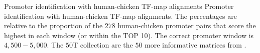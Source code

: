 \begin{table}[t!]
\begin{center}
\begin{minipage}{0.98\linewidth}\setlength{\parindent}{0pt}
\begin{center}
\end{center}
\end{minipage}
          {Promoter identification with human-chicken TF-map alignments}%
          {Promoter identification with human-chicken TF-map alignments.}%
          {The percentages are relative to the proportion of the $278$ human-chicken promoter
           pairs that score the highest in each window (or within the TOP 10). The correct 
           promoter window is $4,500-5,000$. The $50$T collection are the $50$ more informative 
           matrices from .}
\end{center}
\end{table}

